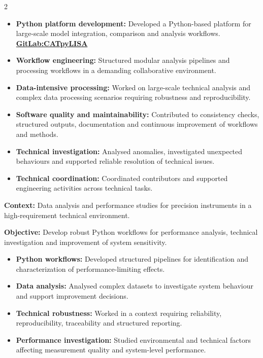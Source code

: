 \documentclass[8pt,a4paper,ragged2e,withhyper]{../_shared/altacv}
\begin{document}
\begin{paracol}{2}
\begin{itemize}
\item \textbf{Python platform development:} Developed a Python-based platform for large-scale model integration, comparison and analysis workflows. \textcolor{DarkPastelRed}{\href{https://gitlab.oca.eu/gboileau/lisa_l3_tools}{\bf GitLab:CATpyLISA}}
\item \textbf{Workflow engineering:} Structured modular analysis pipelines and processing workflows in a demanding collaborative environment.
\item \textbf{Data-intensive processing:} Worked on large-scale technical analysis and complex data processing scenarios requiring robustness and reproducibility.
\item \textbf{Software quality and maintainability:} Contributed to consistency checks, structured outputs, documentation and continuous improvement of workflows and methods.
\item \textbf{Technical investigation:} Analysed anomalies, investigated unexpected behaviours and supported reliable resolution of technical issues.
\item \textbf{Technical coordination:} Coordinated contributors and supported engineering activities across technical tasks.
\end{itemize}
\divider


\textbf{Context:} Data analysis and performance studies for precision instruments in a high-requirement technical environment.

\textbf{Objective:} Develop robust Python workflows for performance analysis, technical investigation and improvement of system sensitivity.

\begin{itemize}
\item \textbf{Python workflows:} Developed structured pipelines for identification and characterization of performance-limiting effects.
\item \textbf{Data analysis:} Analysed complex datasets to investigate system behaviour and support improvement decisions.
\item \textbf{Technical robustness:} Worked in a context requiring reliability, reproducibility, traceability and structured reporting.
\item \textbf{Performance investigation:} Studied environmental and technical factors affecting measurement quality and system-level performance.
\end{itemize}
\divider


\end{paracol}
\end{document}

